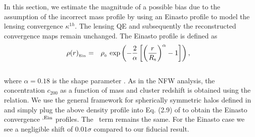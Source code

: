 In this section, we estimate the magnitude of a possible bias due to the assumption of the incorrect mass profile by using an Einasto profile \citep{einasto89} to model the lensing convergence $\kappa^{1h}$.
The lensing QE and subsequently the reconstructed convergence maps remain unchanged.
The Einasto profile is defined as
\begin{eqnarray}
\rho(r)_{_{\rm Ein}} & = &  \rho_{_{0}}\ \mbox{exp}\left( - \frac{2}{\alpha} \left[\left(\frac{r}{R_{\rm s}} \right)^{\alpha} - 1\right]\right),
\label{eq_einasto_density}
\end{eqnarray}\\
where $\alpha = 0.18$ is the shape parameter \citep{ludlow13}. 
As in the NFW analysis, the concentration $c_{200}$ as a function of mass and cluster redshift is obtained using the \citet{duffy08} relation.
We use the general framework for spherically symmetric halos defined in  and simply plug the above density profile into Eq. (2.9) of  to obtain the Einasto convergence \kappaonehalo$^{,\rm Ein}$ profiles. The \kappatwohalo\ term remains the same. For the Einasto case we see a negligible shift of $0.01\sigma$ compared to our fiducial result.
